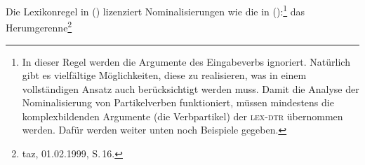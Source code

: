 \begin{comment}
As is clear from looking at the examples discussed
in the data section, there are various ways in which
the arguments of a verb can be realized after nominalization has been applied.
The subject or object of the verb can be realized as a \emph{von}"=PP (\mex{1}a), as a postnominal
genitive NP (\mex{1}b), or it may be left implicit (\mex{1}c).
\eal
\ex\iw{Angebrülle}
das Angebrülle von Norbert\footnote{
        taz, 15.10.1993, S.\,16.%
}
\ex\iw{Rumgeheule}
das Rumgeheule der FDP\footnote{
        taz, 07.01.1998, S.\,3.%
}
\ex\iw{Herumgerenne}
das Herumgerenne\footnote{
        taz, 01.02.1999, S.\,16.%
}
\label{ex-herumgerenne-zwei}
\zl
Rather than giving a detailed account of the various ways in which arguments
can be realized, I will consider the case where all arguments are suppressed.
The main purpose of this subsection is not to provide all the details of argument realizations
in nominal environments, but rather to show how \geens can be accounted
for without any bracketing paradox.
\end{comment}

Die
Lexikonregel in () lizenziert Nominalisierungen
wie die in ():\footnote{
  In dieser Regel werden die Argumente des Eingabeverbs ignoriert. Natürlich
  gibt es vielfältige Möglichkeiten, diese zu realisieren, was in einem vollständigen
  Ansatz auch berücksichtigt werden muss. Damit die Analyse der Nominalisierung von Partikelverben
  funktioniert, müssen mindestens die komplexbildenden Argumente (die Verbpartikel) der \textsc{lex-dtr} übernommen werden. Dafür werden weiter unten noch Beispiele gegeben.%
}
\ea
das Herumgerenne\footnote{
        taz, 01.02.1999, S.\,16.%
}
\label{ex-herumgerenne-zwei}
\z

